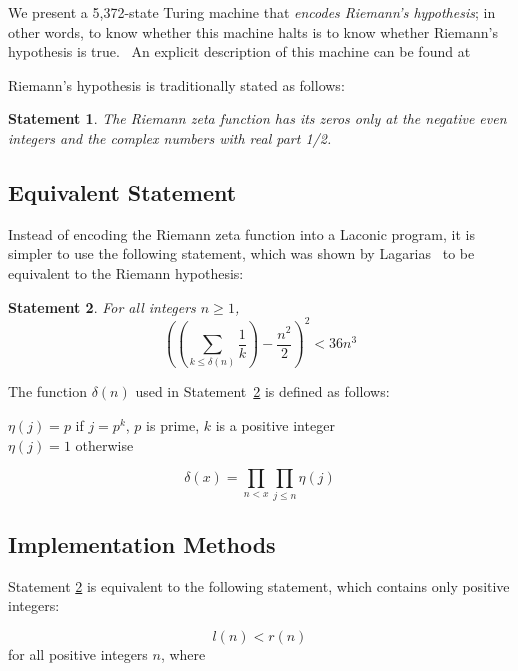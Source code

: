 \documentclass[11pt]{article}
\newtheorem{statement}{Statement}
\newcommand{\rmstatenumstate}{5,372-state }
\newenvironment{nscenter}
 {\parskip=0pt\par\nopagebreak\centering}
 {\par\noindent\ignorespacesafterend}
\begin{document}
We present a \rmstatenumstate Turing machine that \emph{encodes Riemann's hypothesis}; in other words, to know whether this machine halts is to know whether Riemann's hypothesis is true. \ An explicit description of this machine can be found at~\cite{github}

Riemann's hypothesis is traditionally stated as follows:

\begin{statement}
\emph{The Riemann zeta function has its zeros only at the negative even integers and the complex numbers with real part 1/2.}
\label{goldbachstatement}
\end{statement}

\subsection{Equivalent Statement}

Instead of encoding the Riemann zeta function into a Laconic program, it is simpler to use the following statement, which was shown by Lagarias~\cite{riemann} to be equivalent to the Riemann hypothesis:

\begin{statement} \label{eq:riemann}
For all integers $n \ge 1$,
$$\left(\left(\sum_{k \le \delta(n)} \frac{1}{k}\right) - \frac{n^2}{2}\right)^2 < 36n^3$$
\end{statement}

The function $\delta(n)$ used in Statement~\ref{eq:riemann} is defined as follows:

\begin{nscenter}
$\eta(j) = p$ if $j = p^k$, $p$ is prime, $k$ is a positive integer \\
$\eta(j) = 1$ otherwise
\end{nscenter}
$$\delta(x) = \prod_{n<x}\prod_{j \le n} \eta(j)$$

\subsection{Implementation Methods}

Statement \ref{eq:riemann} is equivalent to the following statement, which contains only positive integers\footnotemark:

$$l(n) < r(n)$$ for all positive integers $n$, where
\end{document}
